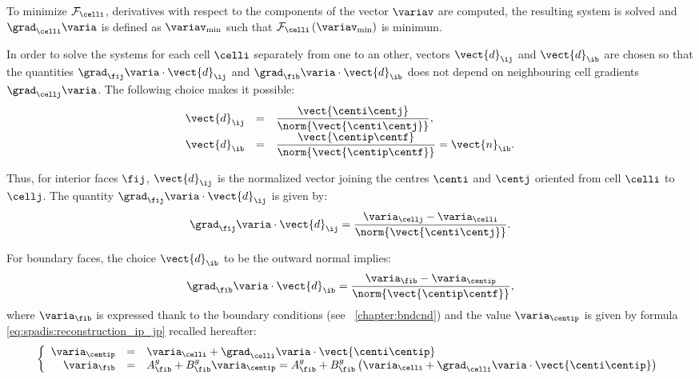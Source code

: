To minimize $\mathcal{F}_\celli$, derivatives with respect to the components of the 
vector $\variav  $ are computed, the resulting system is solved and $\grad_\celli \varia$ is defined 
as $\variav_{\min}$ such that $\mathcal{F}_\celli \left( \variav_{\min}\right)$ is minimum.

In order to solve the systems for each cell $\celli$ separately from one to an other,
vectors $\vect{d}_\ij$ and $\vect{d}_\ib$ are chosen so that the quantities 
$\grad_{\fij} \varia   \cdot \vect{d}_\ij $ and $\grad_{\fib} \varia   \cdot \vect{d}_\ib $
does not depend on neighbouring  cell gradients  $\grad_{\cellj} \varia $.
The following choice makes it possible:
\begin{equation}\label{eq:spadis:gradmc_scalar_d_choice}
\begin{array}{r c l}
\vect{d}_\ij &=& \dfrac{\vect{\centi \centj}}{\norm{\vect{\centi \centj}}}, \\
\vect{d}_\ib &=& \dfrac{\vect{\centip \centf}}{\norm{\vect{\centip \centf}}}= \vect{n}_\ib .
\end{array}
\end{equation}

Thus, for interior faces $\fij$, $\vect{d}_\ij$ is the normalized vector joining 
the centres $\centi$ and $\centj$ oriented from cell $\celli$ to $\cellj$.
The quantity  $\grad_{\fij} \varia   \cdot \vect{d}_\ij$ is given by:
\begin{equation}
\grad_{\fij} \varia   \cdot \vect{d}_\ij =\dfrac{\varia_\cellj - \varia_\celli }{\norm{\vect{\centi \centj}}}.
\end{equation}

For boundary faces, the choice $\vect{d}_\ib$ to be the outward normal implies:
\begin{equation}
\grad_{\fib} \varia   \cdot \vect{d}_\ib =\dfrac{\varia_\fib - \varia_\centip }{\norm{\vect{\centip \centf}}},
\end{equation}
where $\varia_\fib$ is expressed thank to the boundary conditions (see \chaptername~\ref{chapter:bndcnd}) and 
the value $\varia_\centip $ is given by formula \eqref{eq:spadis:reconstruction_ip_jp} recalled hereafter:
%
\begin{equation}\label{eq:spadis:gradmc_bound_value}
\left\{\begin{array}{r c l}
\varia_\centip &=&\varia_\celli +\grad_\celli \varia \cdot \vect{\centi \centip}\\
\varia_\fib &=& A^g_\fib +B^g_\fib \varia_\centip = A^g_\fib +B^g_\fib \left( \varia_\celli +  \grad_\celli \varia \cdot \vect{\centi \centip} \right)
\end{array}\right.
\end{equation}

